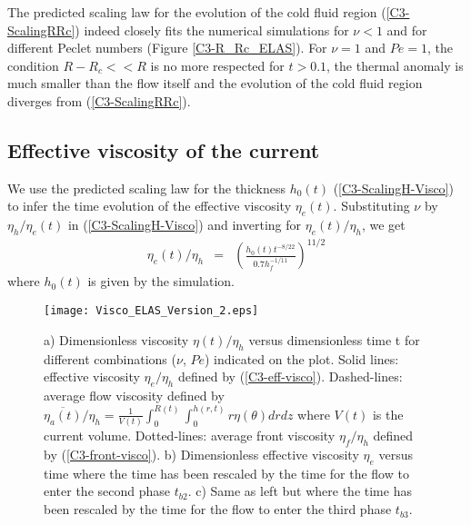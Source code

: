 The predicted scaling  law for the evolution of the  cold fluid region
(\ref{C3-ScalingRRc})  indeed closely  fits the  numerical simulations
for    $\nu<1$   and    for   different    Peclet   numbers    (Figure
\ref{C3-R_Rc_ELAS}). For $\nu=1$ and  $Pe=1$, the condition $R-R_c<<R$
is no more respected for $t>0.1$,  the thermal anomaly is much smaller
than  the flow  itself  and the  evolution of  the  cold fluid  region
diverges from (\ref{C3-ScalingRRc}).

\subsection{Effective viscosity of the current}
\label{C3-sec:effect-visc-blist-e}

We  use  the   predicted  scaling  law  for   the  thickness  $h_0(t)$
(\ref{C3-ScalingH-Visco}) to infer the time evolution of the effective
viscosity  $\eta_e(t)$. Substituting  $\nu$  by $\eta_h/\eta_e(t)$  in
(\ref{C3-ScalingH-Visco}) and inverting for $\eta_e(t)/\eta_h$, we get
\begin{eqnarray}
  \eta_e(t)/\eta_h&=& \left(\frac{h_0(t)t^{-8/22}}{0.7 h_f^{-1/11}}\right)^{11/2}\label{C3-eff-visco}
\end{eqnarray}
where $h_0(t)$ is given by the simulation.
\begin{figure}
  \begin{center}
    \graphicspath{ {/Users/thorey/Documents/These/Projet/Refroidissement/Skin_Model/Figure/JFM_V13/} }
    \texttt{[image: Visco\_ELAS\_Version\_2.eps]}
    \caption{a)   Dimensionless   viscosity  $\eta(t)/\eta_h$   versus
      dimensionless time  t for  different combinations  ($\nu$, $Pe$)
      indicated  on  the  plot.    Solid  lines:  effective  viscosity
      $\eta_e/\eta_h$ defined  by (\ref{C3-eff-visco}).  Dashed-lines:
      average         flow         viscosity        defined         by
      $\overline{\eta_a(t)}/\eta_h                                   =
      \frac{1}{V(t)}\int_0^{R(t)}\int_0^{h(r,t)} r \eta(\theta) dr dz$
      where $V(t)$ is the current volume.  Dotted-lines: average front
      viscosity $\eta_f/\eta_h$ defined by (\ref{C3-front-visco}).  b)
      Dimensionless effective viscosity $\eta_e$ versus time where the
      time has  been rescaled by  the time for  the flow to  enter the
      second phase  $t_{b2}$. c) Same as  left but where the  time has
      been rescaled by the time for  the flow to enter the third phase
      $t_{b3}$.  }
    \label{C3-Visco_ELAS_Version_2}
  \end{center}
\end{figure}

